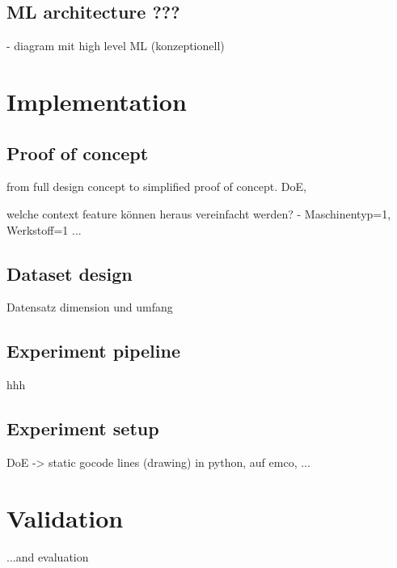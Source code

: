 \documentclass[5p,times,procedia]{elsarticle}
\newenvironment{note}{%
	\noindent
    \color{notecolor}%
}{%
    \par\medskip%
}
\begin{document}
\subsection{ML architecture ???}
\vspace*{-\baselineskip}
\begin{note}
	- diagram mit high level ML (konzeptionell)
\end{note}





\section{Implementation}
\subsection{Proof of concept}
\vspace*{-\baselineskip}
from full design concept to simplified proof of concept.
DoE,  

welche context feature können heraus vereinfacht werden? - Maschinentyp=1, Werkstoff=1 ...



\subsection{Dataset design}
\vspace*{-\baselineskip}
Datensatz dimension und umfang

\subsection{Experiment pipeline}
\vspace*{-\baselineskip}
hhh

\subsection{Experiment setup}
\vspace*{-\baselineskip}
DoE -> static gocode lines (drawing) 
in python, auf emco, ...


 
\section{Validation}
\begin{note}
	...and evaluation

\end{note}
\end{document}
